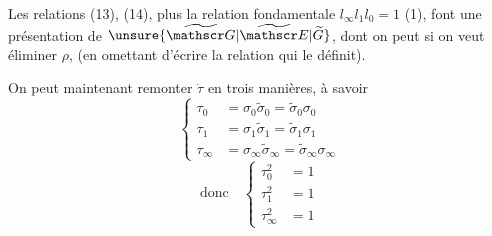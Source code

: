 Les relations (13), (14), plus la relation fondamentale $l_\infty l_1l_0=1$ (1), font une présentation de $\unsure{\widetilde{\mathscr G}|\widetilde{\mathscr E}|\widetilde G}$, dont on peut si on veut éliminer $\rho$, (en omettant d'écrire la relation qui le définit).

On peut maintenant remonter $\dot\tau$ en trois manières, à savoir
\[
\left\{\begin{aligned}
\tau_0&=\sigma_0\widetilde\sigma_0=\widetilde\sigma_0\sigma_0\\
\tau_1&=\sigma_1\widetilde\sigma_1=\widetilde\sigma_1\sigma_1\\
\tau_\infty&=\sigma_\infty\widetilde\sigma_\infty=\widetilde\sigma_\infty\sigma_\infty
\end{aligned}\right.\tag*{(15)}
\]
\[
\text{donc}\quad
\left\{\begin{aligned}
\tau_0^2&=1\\
\tau_1^2&=1\\
\tau_\infty^2&=1
\end{aligned}\right.\tag*{(16)}
\]
